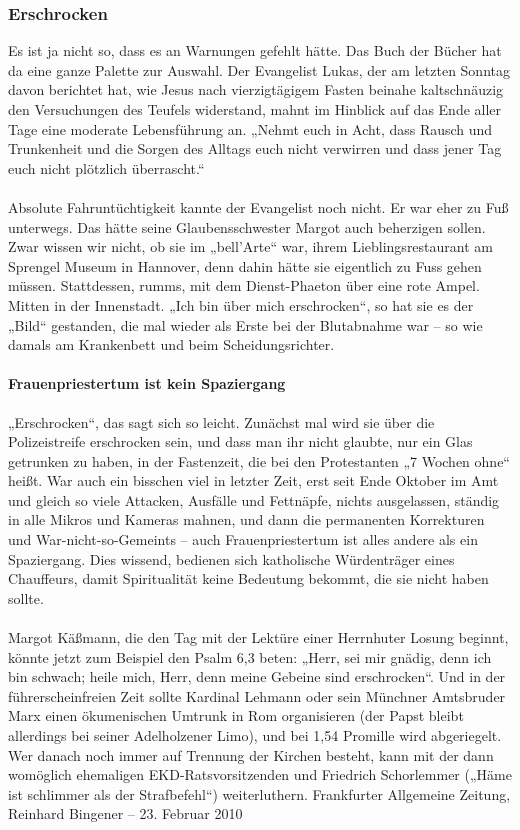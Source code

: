 \documentclass[a4paper,12pt,oneside]{scrbook}
\begin{document}
\subsubsection{Erschrocken}
Es ist ja nicht so, dass es an Warnungen gefehlt hätte. Das Buch der Bücher hat da eine ganze Palette zur Auswahl. Der Evangelist Lukas, der am letzten Sonntag davon berichtet hat, wie Jesus nach vierzigtägigem Fasten beinahe kaltschnäuzig den Versuchungen des Teufels widerstand, mahnt im Hinblick auf das Ende aller Tage eine moderate Lebensführung an. „Nehmt euch in Acht, dass Rausch und Trunkenheit und die Sorgen des Alltags euch nicht verwirren und dass jener Tag euch nicht plötzlich überrascht.“
\\\\
Absolute Fahruntüchtigkeit kannte der Evangelist noch nicht. Er war eher zu Fuß unterwegs. Das hätte seine Glaubensschwester Margot auch beherzigen sollen. Zwar wissen wir nicht, ob sie im „bell’Arte“ war, ihrem Lieblingsrestaurant am Sprengel Museum in Hannover, denn dahin hätte sie eigentlich zu Fuss gehen müssen. Stattdessen, rumms, mit dem Dienst-Phaeton über eine rote Ampel. Mitten in der Innenstadt. „Ich bin über mich erschrocken“, so hat sie es der „Bild“ gestanden, die mal wieder als Erste bei der Blutabnahme war – so wie damals am Krankenbett und beim Scheidungsrichter.
 \paragraph{Frauenpriestertum ist kein Spaziergang}
 „Erschrocken“, das sagt sich so leicht. Zunächst mal wird sie über die Polizeistreife erschrocken sein, und dass man ihr nicht glaubte, nur ein Glas getrunken zu haben, in der Fastenzeit, die bei den Protestanten „7 Wochen ohne“ heißt. War auch ein bisschen viel in letzter Zeit, erst seit Ende Oktober im Amt und gleich so viele Attacken, Ausfälle und Fettnäpfe, nichts ausgelassen, ständig in alle Mikros und Kameras mahnen, und dann die permanenten Korrekturen und War-nicht-so-Gemeints – auch Frauenpriestertum ist alles andere als ein Spaziergang. Dies wissend, bedienen sich katholische Würdenträger eines Chauffeurs, damit Spiritualität keine Bedeutung bekommt, die sie nicht haben sollte.
\\\\
Margot Käßmann, die den Tag mit der Lektüre einer Herrnhuter Losung beginnt, könnte jetzt zum Beispiel den Psalm 6,3 beten: „Herr, sei mir gnädig, denn ich bin schwach; heile mich, Herr, denn meine Gebeine sind erschrocken“. Und in der führerscheinfreien Zeit sollte Kardinal Lehmann oder sein Münchner Amtsbruder Marx einen ökumenischen Umtrunk in Rom organisieren (der Papst bleibt allerdings bei seiner Adelholzener Limo), und bei 1,54 Promille wird abgeriegelt. Wer danach noch immer auf Trennung der Kirchen besteht, kann mit der dann womöglich ehemaligen EKD-Ratsvorsitzenden und Friedrich Schorlemmer („Häme ist schlimmer als der Strafbefehl“) weiterluthern.
Frankfurter Allgemeine Zeitung, Reinhard Bingener \hfill -- \hfill 23. Februar 2010
\end{document}
